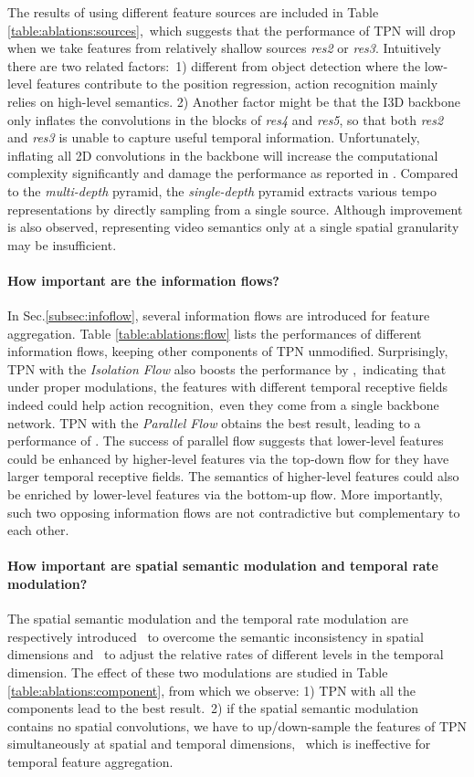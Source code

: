 \documentclass[10pt,twocolumn,letterpaper]{article}
\begin{document}
The results of using different feature sources are included in Table \ref{table:ablations:sources},\
which suggests that the performance of TPN will drop when we take features from relatively shallow sources \eg \emph{res2} or \emph{res3}.
Intuitively there are two related factors:\
1) different from object detection where the low-level features contribute to the position regression, action recognition mainly relies on high-level semantics.
2) Another factor might be that the I3D backbone \cite{slowfast} only inflates the convolutions in the blocks of \emph{res4} and \emph{res5},
so that both \emph{res2} and \emph{res3} is unable to capture useful temporal information.
Unfortunately, inflating all 2D convolutions in the backbone will increase the computational complexity significantly and damage the performance as reported in \cite{slowfast}.
Compared to the \emph{multi-depth} pyramid, the \emph{single-depth} pyramid extracts various tempo representations by directly sampling from a single source.
Although improvement is also observed, representing video semantics only at a single spatial granularity may be insufficient.


\paragraph{How important are the information flows?}
In Sec.\ref{subsec:infoflow}, several information flows are introduced for feature aggregation.
Table \ref{table:ablations:flow} lists the performances of different information flows, keeping other components of TPN unmodified.
Surprisingly, TPN with the \emph{Isolation Flow} also boosts the performance by ,\
indicating that under proper modulations, the features with different temporal receptive fields indeed could help action recognition,\
even they come from a single backbone network.
TPN with the \emph{Parallel Flow} obtains the best result, leading to a performance of .
The success of parallel flow suggests that lower-level features could be enhanced by higher-level features via the top-down flow for they have larger temporal receptive fields.
The semantics of higher-level features could also be enriched by lower-level features via the bottom-up flow.
More importantly, such two opposing information flows are not contradictive but complementary to each other.



\paragraph{How important are spatial semantic modulation and temporal rate modulation?}
The spatial semantic modulation and the temporal rate modulation are respectively introduced \
to overcome the semantic inconsistency in spatial dimensions and \
to adjust the relative rates of different levels in the temporal dimension.
The effect of these two modulations are studied in Table \ref{table:ablations:component}, from which we observe:
1) TPN with all the components lead to the best result.\
2) if the spatial semantic modulation contains no spatial convolutions, we have to up/down-sample the features of TPN simultaneously at spatial and temporal dimensions, \
which is ineffective for temporal feature aggregation.
\end{document}
